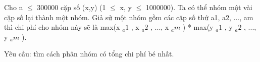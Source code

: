 Cho n $\le$ 300000 cặp số (x,y) (1 $\le$ x, y $\le$ 1000000). Ta có thể nhóm một vài cặp số lại thành một nhóm. Giả sử một nhóm gồm các cặp số thứ a1, a2, ..., am thì chi phí cho nhóm này sẽ là max(x   $_    a1   $   , x   $_    a2   $   , ..., x   $_    am   $   ) * max(y   $_    a1   $   , y   $_    a2   $   , ..., y   $_    am   $   ).  

   Yêu cầu: tìm cách phân nhóm có tổng chi phí bé nhất.